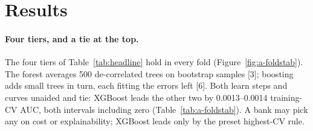 \section{Results}
\label{sec:results}

\paragraph{Four tiers, and a tie at the top.}
The four tiers of Table~\ref{tab:headline} hold in every fold (Figure~\ref{fig:a-foldstab}). The forest averages 500 de-correlated trees on bootstrap samples [3]; boosting adds small trees in turn, each fitting the errors left [6]. Both learn steps and curves unaided and tie: XGBoost leads the other two by 0.0013--0.0014 training-CV AUC, both intervals including zero (Table~\ref{tab:a-foldstab}). A bank may pick any on cost or explainability; XGBoost leads only by the preset highest-CV rule.

